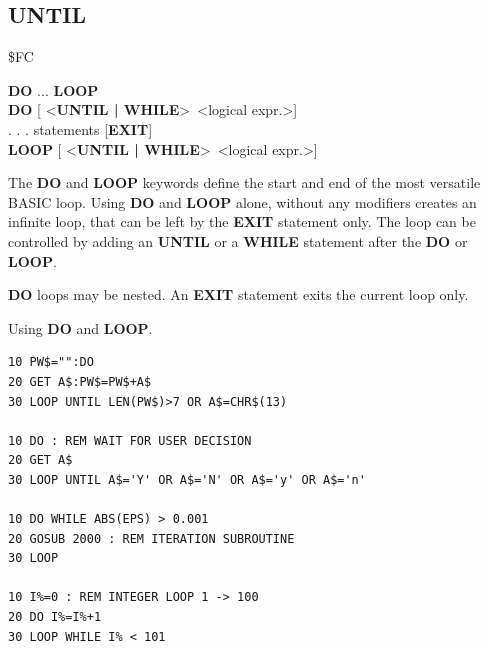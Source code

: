 
\newpage
\subsection{UNTIL}
\begin{description}[leftmargin=2cm,style=nextline]
\item [Token:] \$FC
\item [Format:] {\bf DO} ... {\bf LOOP} \\
                {\bf DO} [ <{\bf UNTIL | WHILE}> <logical expr.>] \\
                . . . statements [{\bf EXIT}] \\
                {\bf LOOP} [ <{\bf UNTIL | WHILE}> <logical expr.>]
\item [Usage:] The {\bf DO} and {\bf LOOP} keywords define
               the start and end of the most versatile BASIC loop.
               Using {\bf DO} and {\bf LOOP} alone, without any
               modifiers creates an infinite loop, that can be left
               by the {\bf EXIT} statement only. The loop can be
               controlled by adding an {\bf UNTIL} or a {\bf WHILE}
               statement after the {\bf DO} or {\bf LOOP}.

\item [Remarks:] {\bf DO} loops may be nested. An {\bf EXIT} statement
               exits the current loop only.
\item [Example:] Using {\bf DO} and {\bf LOOP}.
\begin{tcolorbox}[colback=black,coltext=white]
\verbatimfont{\codefont}
\begin{verbatim}
10 PW$="":DO
20 GET A$:PW$=PW$+A$
30 LOOP UNTIL LEN(PW$)>7 OR A$=CHR$(13)

10 DO : REM WAIT FOR USER DECISION
20 GET A$
30 LOOP UNTIL A$='Y' OR A$='N' OR A$='y' OR A$='n'

10 DO WHILE ABS(EPS) > 0.001
20 GOSUB 2000 : REM ITERATION SUBROUTINE
30 LOOP

10 I%=0 : REM INTEGER LOOP 1 -> 100
20 DO I%=I%+1
30 LOOP WHILE I% < 101
\end{verbatim}
\end{tcolorbox}
\end{description}


\newpage
